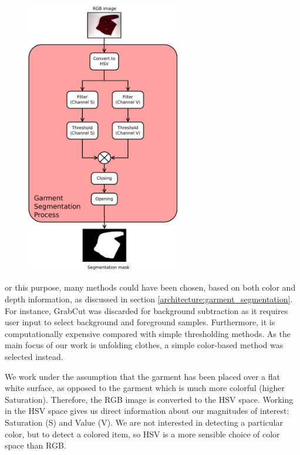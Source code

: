 \begin{figure}[thpb]
    \centering
    \includegraphics[width=0.6\textwidth]
    {figures/Garment-segmentation-process-diagram.pdf}
    \caption{}
    \label{fig:background_subtration_processes}
\end{figure}
or this purpose, many methods could have been chosen, based on both color and depth information, as discussed in section \ref{architecture:garment_segmentation}. For instance, GrabCut  was discarded for background subtraction as it requires user input to select background and foreground samples. Furthermore, it is computationally expensive compared with simple thresholding methods. As the main focus of our work is unfolding clothes, a simple color-based method was selected instead. 


We work under the assumption that the garment has been placed over a flat white surface, as opposed to the garment which is much more colorful (higher Saturation). Therefore, the RGB image is converted to the HSV space. Working in the HSV space gives us direct information about our magnitudes of interest: Saturation (S) and Value (V). We are not interested in detecting a particular color, but to detect a colored item, so HSV is a more sensible choice of color space than RGB. 

